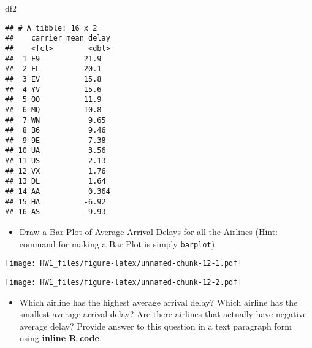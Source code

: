 \documentclass[
]{article}
\newenvironment{Shaded}{\begin{snugshade}}{\end{snugshade}}
\newcommand{\DataTypeTok}[1]{\textcolor[rgb]{0.13,0.29,0.53}{#1}}
\newcommand{\KeywordTok}[1]{\textcolor[rgb]{0.13,0.29,0.53}{\textbf{#1}}}
\newcommand{\NormalTok}[1]{#1}
\newcommand{\OperatorTok}[1]{\textcolor[rgb]{0.81,0.36,0.00}{\textbf{#1}}}
\newcommand{\StringTok}[1]{\textcolor[rgb]{0.31,0.60,0.02}{#1}}
\providecommand{\tightlist}{%
  \setlength{\itemsep}{0pt}\setlength{\parskip}{0pt}}
\begin{document}
\begin{Shaded}
\begin{Highlighting}[]
\NormalTok{df2}
\end{Highlighting}
\end{Shaded}

\begin{verbatim}
## # A tibble: 16 x 2
##    carrier mean_delay
##    <fct>        <dbl>
##  1 F9          21.9  
##  2 FL          20.1  
##  3 EV          15.8  
##  4 YV          15.6  
##  5 OO          11.9  
##  6 MQ          10.8  
##  7 WN           9.65 
##  8 B6           9.46 
##  9 9E           7.38 
## 10 UA           3.56 
## 11 US           2.13 
## 12 VX           1.76 
## 13 DL           1.64 
## 14 AA           0.364
## 15 HA          -6.92 
## 16 AS          -9.93
\end{verbatim}

\begin{itemize}
\tightlist
\item
  Draw a Bar Plot of Average Arrival Delays for all the Airlines (Hint:
  command for making a Bar Plot is simply \texttt{barplot})
\end{itemize}

\begin{Shaded}
\end{Shaded}

\texttt{[image: HW1\_files/figure-latex/unnamed-chunk-12-1.pdf]}

\begin{Shaded}
\end{Shaded}

\texttt{[image: HW1\_files/figure-latex/unnamed-chunk-12-2.pdf]}

\begin{itemize}
\tightlist
\item
  Which airline has the highest average arrival delay? Which airline has
  the smallest average arrival delay? Are there airlines that actually
  have negative average delay? Provide answer to this question in a text
  paragraph form using \textbf{inline R code}.
\end{itemize}
\end{document}
